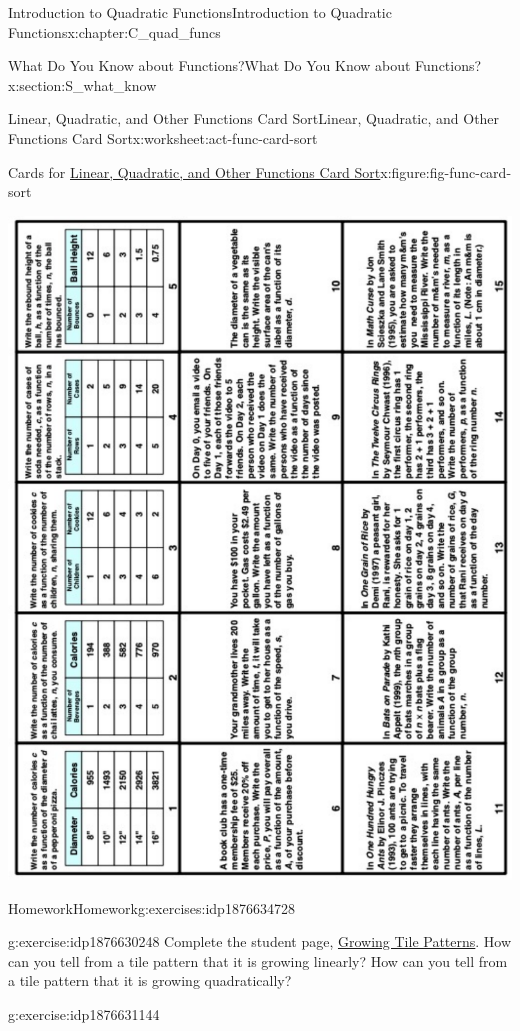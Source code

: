 \documentclass[oneside,10pt,]{book}
\numberwithin{equation}{chapter}
\begin{document}
\begin{chapterptx}{Introduction to Quadratic Functions}{}{Introduction to Quadratic Functions}{}{}{x:chapter:C_quad_funcs}
\begin{sectionptx}{What Do You Know about Functions?}{}{What Do You Know about Functions?}{}{}{x:section:S_what_know}
\begin{worksheet-subsection}{Linear, Quadratic, and Other Functions Card Sort}{}{Linear, Quadratic, and Other Functions Card Sort}{}{}{x:worksheet:act-func-card-sort}
\begin{figureptx}{Cards for \hyperref[x:worksheet:act-func-card-sort]{Linear, Quadratic, and Other Functions Card Sort}}{x:figure:fig-func-card-sort}{}
\begin{image}{0}{1}{0}
\includegraphics[width=\linewidth]{external/func-card-sort.pdf}
\end{image}%
\tcblower
\end{figureptx}%
\end{worksheet-subsection}
\restoregeometry
%
%
\typeout{************************************************}
\typeout{************************************************}
%
\begin{exercises-subsection}{Homework}{}{Homework}{}{}{g:exercises:idp1876634728}
\begin{divisionexercise}{1}{}{}{g:exercise:idp1876630248}%
Complete the student page, \hyperref[x:worksheet:act-grow-tiles]{Growing Tile Patterns}. How can you tell from a tile pattern that it is growing linearly? How can you tell from a tile pattern that it is growing quadratically?%
\end{divisionexercise}%
\begin{divisionexercise}{2}{}{}{g:exercise:idp1876631144}%

\end{divisionexercise}
\end{exercises-subsection}
\end{sectionptx}
\end{chapterptx}
\end{document}
